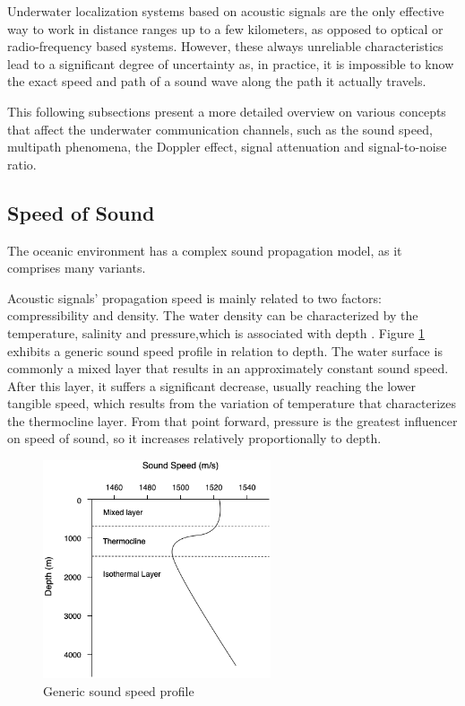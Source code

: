 Underwater localization systems based on acoustic signals are the only effective way to work in distance ranges up to a few kilometers, as opposed to optical or radio-frequency based systems. However, these always unreliable characteristics lead to a significant degree of uncertainty as, in practice, it is impossible to know the exact speed and path of a sound wave along the path it actually travels.

This following subsections present a more detailed overview on various concepts that affect the underwater communication channels, such as the sound speed, multipath phenomena, the Doppler effect, signal attenuation and signal-to-noise ratio.

\subsection{Speed of Sound} \label{subsec: speed-sound}

The oceanic environment has a complex sound propagation model, as it comprises many variants.

Acoustic signals' propagation speed is mainly related to two factors: compressibility and density. The water density can be characterized by the temperature, salinity and pressure,which is associated with depth \cite{ocean-acoust}. Figure \ref{fig:spd-sound} exhibits a generic sound speed profile in relation to depth. The water surface is commonly a mixed layer that results in an approximately constant sound speed. After this layer, it suffers a significant decrease, usually reaching the lower tangible speed, which results from the variation of temperature that characterizes the thermocline layer. From that point forward, pressure is the greatest influencer on speed of sound, so it increases relatively proportionally to depth.

\begin{figure}[!htbp]
	\centering
	\includegraphics[width=0.6\textwidth]{figures/sound-profile}
	\caption{Generic sound speed profile}
	\label{fig:spd-sound}
\end{figure}

